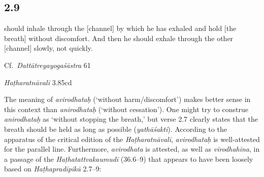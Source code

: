 \begin{ekdosis}

\subsection*{2.9}
\begin{translation} should inhale through the [channel] by which he has exhaled and hold [the breath] without discomfort. And then he should exhale through the other [channel] slowly, not quickly.
\end{translation}

\begin{sources}[hp02_009]
Cf.~\emph{Dattātreyayogaśāstra} 61 

\begin{versinnote}
\end{versinnote}
\end{sources}

\begin{testimonia}[hp02_009]
\emph{Haṭharatnāvalī} 3.85cd%

\begin{versinnote}
\tl{\var{85d avirodhataḥ ] anirodhataḥ P}\\!}
\end{versinnote}
\end{testimonia}

\begin{philcomm}[hp02_009]
The meaning of \emph{avirodhataḥ} (‘without harm/discomfort’) makes better sense in this context than \emph{anirodhataḥ} (‘without cessation’). One might try to construe \emph{anirodhataḥ} as ‘without stopping the breath,’ but verse 2.7 clearly states that the breath should be held as long as possible (\emph{yathāśakti}). According to the apparatus of the critical edition of the \emph{Haṭharatnāvalī}, \emph{avirodhataḥ} is well-attested for the parallel line. Furthermore, \emph{avirodhata} is attested, as well as \emph{virodhahīna}, in a passage of the \emph{Haṭhatattvakaumudī} (36.6–9) that appears to have been loosely based on \emph{Haṭhapradīpikā} 2.7–9:


\end{philcomm}
\end{ekdosis}

